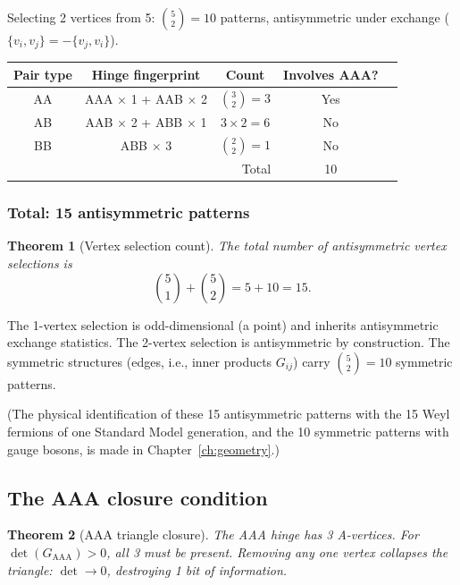 \documentclass[12pt]{article}
\newtheorem{theorem}{Theorem}[section]
\theoremstyle{remark}
\theoremstyle{definition}
\begin{document}
Selecting 2 vertices from 5: $\binom{5}{2} = 10$ patterns, antisymmetric under exchange ($\{v_i, v_j\} = -\{v_j, v_i\}$).

\begin{center}
\begin{tabular}{ccccc}
\hline
Pair type & Hinge fingerprint & Count & Involves AAA? \\
\hline
AA & AAA $\times$ 1 + AAB $\times$ 2 & $\binom{3}{2} = 3$ & Yes \\
AB & AAB $\times$ 2 + ABB $\times$ 1 & $3 \times 2 = 6$ & No \\
BB & ABB $\times$ 3 & $\binom{2}{2} = 1$ & No \\
\hline
\multicolumn{3}{r}{Total} & 10 \\
\hline
\end{tabular}
\end{center}

\subsubsection{Total: 15 antisymmetric patterns}

\begin{theorem}[Vertex selection count]
\label{thm:15}
The total number of antisymmetric vertex selections is
\begin{equation}
\binom{5}{1} + \binom{5}{2} = 5 + 10 = 15.
\end{equation}
\end{theorem}

The 1-vertex selection is odd-dimensional (a point) and inherits antisymmetric exchange statistics. The 2-vertex selection is antisymmetric by construction. The symmetric structures (edges, i.e., inner products $G_{ij}$) carry $\binom{5}{2} = 10$ symmetric patterns.

(The physical identification of these 15 antisymmetric patterns with the 15 Weyl fermions of one Standard Model generation, and the 10 symmetric patterns with gauge bosons, is made in Chapter~\ref{ch:geometry}.)

\subsection{The AAA closure condition}
\label{sec:confinement_geometry}

\begin{theorem}[AAA triangle closure]
\label{thm:aaa_closure}
The AAA hinge has 3 A-vertices. For $\det(G_{\text{AAA}}) > 0$, all 3 must be present. Removing any one vertex collapses the triangle: $\det \to 0$, destroying 1 bit of information.
\end{theorem}
\end{document}
